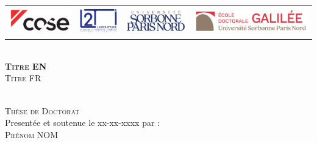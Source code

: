 \begin{titlepage}
    \begin{center}
        \begin{tabular}{@{\hskip -1cm}c@{\hskip 1cm}c@{\hskip 1cm}c@{\hskip 1cm}c}
            \includegraphics[height=1.2cm]{images/logos/cose_left.png} &
            \includegraphics[height=1.2cm]{images/logos/l2ti.png} &
            \includegraphics[height=1.2cm]{images/logos/logo_USPN.png} &
            \includegraphics[height=1.2cm]{images/logos/logo_ed.png}\\
        \end{tabular}
    \end{center}

    
    \begin{center}

        
        \vfill
        \vspace{6mm}

        \HRule \\[4mm]
        { \huge \bfseries \textsc{Titre EN} }\\[4mm]
        {\LARGE \textsc{Titre FR}}\\
        \HRule \\
    \end{center}
    
    \vfill
    
    \begin{center}
        {\Large \textsc{Thèse de Doctorat}}\\[.5cm]
        Presentée et soutenue le xx-xx-xxxx par :\\
        \textsc{\Large Prénom NOM}\\[0.5cm] 


\end{center}
\end{titlepage}
